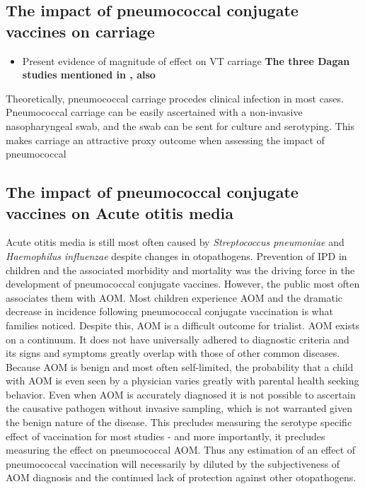 \documentclass[]{book}
\providecommand{\tightlist}{%
  \setlength{\itemsep}{0pt}\setlength{\parskip}{0pt}}
\theoremstyle{definition}
\theoremstyle{definition}
\theoremstyle{definition}
\theoremstyle{remark}
\begin{document}
\subsection{The impact of pneumococcal conjugate vaccines on
carriage}\label{carriageimpact}

\begin{itemize}
\tightlist
\item
  Present evidence of magnitude of effect on VT carriage \textbf{The
  three Dagan studies mentioned in \citep{Eskola2001}, also
  \citep{Prymula2006, OBrien2007a}}
\end{itemize}

Theoretically, pneumococcal carriage procedes clinical infection in most
cases. Pneumococcal carriage can be easily ascertained with a
non-invasive nasopharyngeal swab, and the swab can be sent for culture
and serotyping. This makes carriage an attractive proxy outcome when
assessing the impact of pneumococcal

\subsection{The impact of pneumococcal conjugate vaccines on Acute
otitis
media}\label{the-impact-of-pneumococcal-conjugate-vaccines-on-acute-otitis-media}

Acute otitis media is still most often caused by \emph{Streptococcus
pneumoniae} and \emph{Haemophilus influenzae} despite changes in
otopathogens. Prevention of IPD in children and the associated morbidity
and mortality was the driving force in the development of pneumococcal
conjugate vaccines. However, the public most often associates them with
AOM. Most children experience AOM and the dramatic decrease in incidence
following pneumococcal conjugate vaccination is what families noticed.
Despite this, AOM is a difficult outcome for trialist. AOM exists on a
continuum. It does not have universally adhered to diagnostic criteria
and its signs and symptoms greatly overlap with those of other common
diseases. Because AOM is benign and most often self-limited, the
probability that a child with AOM is even seen by a physician varies
greatly with parental health seeking behavior. Even when AOM is
accurately diagnosed it is not possible to ascertain the causative
pathogen without invasive sampling, which is not warranted given the
benign nature of the disease. This precludes measuring the serotype
specific effect of vaccination for most studies - and more importantly,
it precludes measuring the effect on pneumococcal AOM. Thus any
estimation of an effect of pneumococcal vaccination will necessarily by
diluted by the subjectiveness of AOM diagnosis and the continued lack of
protection against other otopathogens.
\end{document}
